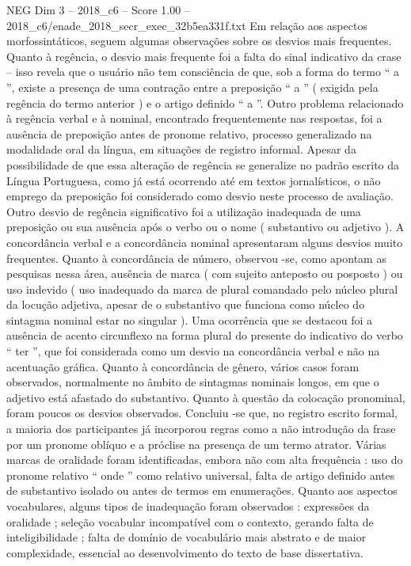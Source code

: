 \begin{textsample}{NEG Dim 3 – 2018\_c6 – Score 1.00 – 2018\_c6/enade\_2018\_secr\_exec\_32b5ea331f.txt}
Em relação aos aspectos morfossintáticos, seguem algumas observações sobre os desvios mais frequentes.
Quanto à regência, o desvio mais frequente foi a falta do sinal indicativo da crase – isso revela que o usuário não tem consciência de que, sob a forma do termo “ a ”, existe a presença de uma contração entre a preposição “ a ” ( exigida pela regência do termo anterior ) e o artigo definido “ a ”.
Outro problema relacionado à regência verbal e à nominal, encontrado frequentemente nas respostas, foi a ausência de preposição antes de pronome relativo, processo generalizado na modalidade oral da língua, em situações de registro informal.
Apesar da possibilidade de que essa alteração de regência se generalize no padrão escrito da Língua Portuguesa, como já está ocorrendo até em textos jornalísticos, o não emprego da preposição foi considerado como desvio neste processo de avaliação.
Outro desvio de regência significativo foi a utilização inadequada de uma preposição ou sua ausência após o verbo ou o nome ( substantivo ou adjetivo ).
A concordância verbal e a concordância nominal apresentaram alguns desvios muito frequentes.
Quanto à concordância de número, observou -se, como apontam as pesquisas nessa área, ausência de marca ( com sujeito anteposto ou posposto ) ou uso indevido ( uso inadequado da marca de plural comandado pelo núcleo plural da locução adjetiva, apesar de o substantivo que funciona como núcleo do sintagma nominal estar no singular ).
Uma ocorrência que se destacou foi a ausência de acento circunflexo na forma plural do presente do indicativo do verbo “ ter ”, que foi considerada como um desvio na concordância verbal e não na acentuação gráfica.
Quanto à concordância de gênero, vários casos foram observados, normalmente no âmbito de sintagmas nominais longos, em que o adjetivo está afastado do substantivo.
Quanto à questão da colocação pronominal, foram poucos os desvios observados.
Concluiu -se que, no registro escrito formal, a maioria dos participantes já incorporou regras como a não introdução da frase por um pronome oblíquo e a próclise na presença de um termo atrator.
Várias marcas de oralidade foram identificadas, embora não com alta frequência : uso do pronome relativo “ onde ” como relativo universal, falta de artigo definido antes de substantivo isolado ou antes de termos em enumerações.
Quanto aos aspectos vocabulares, alguns tipos de inadequação foram observados : expressões da oralidade ; seleção vocabular incompatível com o contexto, gerando falta de inteligibilidade ; falta de domínio de vocabulário mais abstrato e de maior complexidade, essencial ao desenvolvimento do texto de base dissertativa.

\end{textsample}
